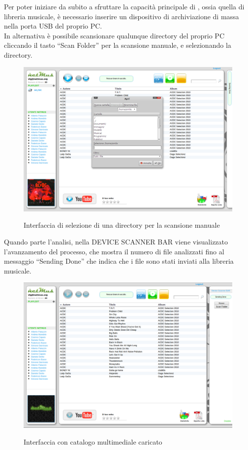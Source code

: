 Per poter iniziare da subito a sfruttare la capacit\`a principale di ,
ossia quella di libreria musicale, \`e necessario inserire un dispositivo di
archiviazione di massa nella porta USB del proprio PC.\\
In alternativa \`e possibile scansionare qualunque directory del proprio PC
cliccando il tasto ``Scan Folder'' per la scansione manuale, e
selezionando la directory.\\
\begin{figure}[htbp]
  \centering
  \includegraphics[width=15cm]{img/MU/scan_manual.png}\\ 
\caption{Interfaccia di selezione di una directory per la scansione
manuale}
\end{figure}

Quando parte l'analisi, nella DEVICE SCANNER BAR viene visualizzato
l'avanzamento del processo, che mostra il numero di file analizzati fino al
messaggio ``Sending Done'' che indica che i file sono stati inviati alla
libreria musicale.\\
\begin{figure}[htbp]
  \centering
  \includegraphics[width=15cm]{img/MU/song_loaded.png}\\
\caption{Interfaccia con catalogo multimediale caricato}
\end{figure}

